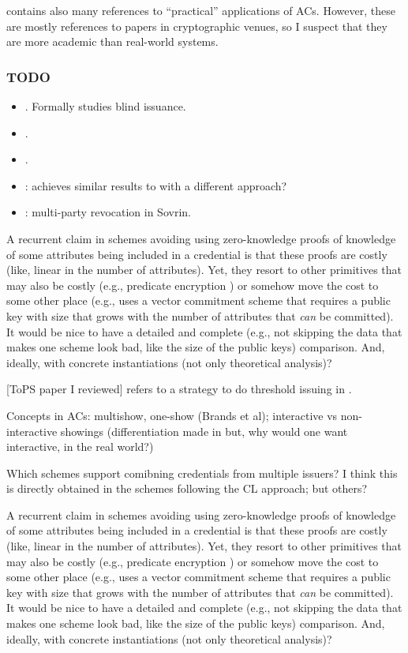 \cite{hs21} contains also many references to ``practical'' applications of
ACs. However, these are mostly references to papers in cryptographic venues,
so I suspect that they are more academic than real-world systems.

\subsubsection{TODO}

\begin{itemize}
\item \cite{bcl04}. Formally studies blind issuance.
\item \cite{bckl08}.
\item \cite{sand20}.
\item \cite{kkl+16}: achieves similar results to \cite{cgm16} with a different approach?
\item \cite{hkrw21}: multi-party revocation in Sovrin.
\end{itemize}

A recurrent claim in schemes avoiding using zero-knowledge proofs of knowledge
of some attributes being included in a credential is that these proofs are costly
(like, linear in the number of attributes). Yet, they resort to other primitives
that may also be costly (e.g., predicate encryption \cite{dmm+18}) or somehow move
the cost to some other place (e.g., \cite{fhs19} uses a vector commitment scheme
that requires a public key with size that grows with the number of attributes
that \emph{can} be committed). It would be nice to have a detailed and complete
(e.g., not skipping the data that makes one scheme look bad, like the size of
the public keys) comparison. And, ideally, with concrete instantiations (not only
theoretical analysis)?

[ToPS paper I reviewed] refers to a strategy to do threshold issuing in \cite{bbh06}.

Concepts in ACs: multishow, one-show (Brands et al); interactive vs non-interactive
showings (differentiation made in \cite[p.6]{fhs19} but, why would one want interactive,
in the real world?)

Which schemes support comibning credentials from multiple issuers? I think this
is directly obtained in the schemes following the CL approach; but others?

A recurrent claim in schemes avoiding using zero-knowledge proofs of knowledge
of some attributes being included in a credential is that these proofs are costly
(like, linear in the number of attributes). Yet, they resort to other primitives
that may also be costly (e.g., predicate encryption \cite{dmm+18}) or somehow move
the cost to some other place (e.g., \cite{fhs19} uses a vector commitment scheme
that requires a public key with size that grows with the number of attributes
that \emph{can} be committed). It would be nice to have a detailed and complete
(e.g., not skipping the data that makes one scheme look bad, like the size of
the public keys) comparison. And, ideally, with concrete instantiations (not only
theoretical analysis)?

